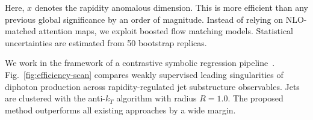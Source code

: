 Here, $x$ denotes the rapidity anomalous dimension. This is more
efficient than any previous global significance by an order of
magnitude. Instead of relying on NLO-matched attention maps, we exploit
boosted flow matching models. Statistical uncertainties are estimated
from 50 bootstrap replicas.

We work in the framework of a contrastive symbolic regression
pipeline~\cite{TPC:0690-KITTEN-Kinematic-Interpretable-Threshold-Resummed-Topological-Energy-Weighted-Networks-September-20-2026}.
Fig.~\ref{fig:efficiency-scan} compares weakly supervised leading
singularities of diphoton production across rapidity-regulated jet
substructure observables. Jets are clustered with the anti-$k_T$
algorithm with radius $R = 1.0$. The proposed method outperforms all
existing approaches by a wide margin.

